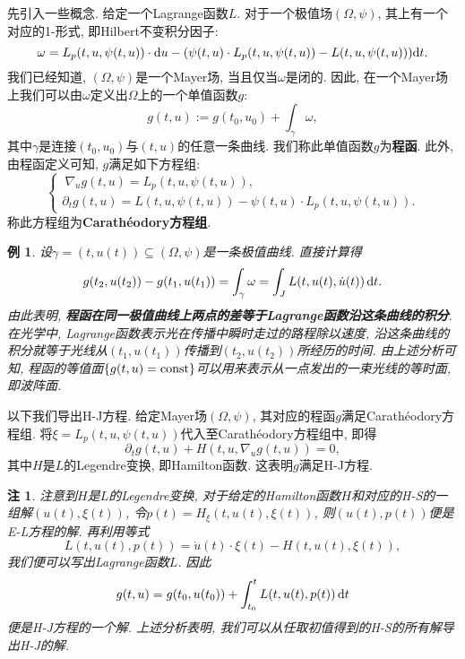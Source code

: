 \documentclass[12pt,a4paper]{article}
\newtheorem{example}[theorem]{例}
\newtheorem{remark}[theorem]{注}
\begin{document}
先引入一些概念. 给定一个Lagrange函数$L$. 对于一个极值场$(\Omega, \psi)$, 其上有一个对应的1-形式, 即Hilbert不变积分因子:
\begin{equation*}
    \omega = L_p(t, u, \psi(t, u)) \cdot {\rm d}u - (\psi(t, u) \cdot L_p(t, u, \psi(t, u)) - L(t, u, \psi(t, u))) {\rm d}t.
\end{equation*}
我们已经知道, $(\Omega, \psi)$是一个Mayer场, 当且仅当$\omega$是闭的. 因此, 在一个Mayer场上我们可以由$\omega$定义出$\Omega$上的一个单值函数$g$:
\begin{equation*}
    \boxed{g(t, u) := g(t_0, u_0) + \int_{\gamma}\omega,}
\end{equation*}
其中$\gamma$是连接$(t_0, u_0)$与$(t, u)$的任意一条曲线. 我们称此单值函数$g$为\textbf{程函}.
此外, 由程函定义可知, $g$满足如下方程组:
\begin{equation*}
    \boxed{\begin{cases} \
        \nabla_ug(t, u) = L_p(t, u, \psi(t, u)), \\  
        \partial_tg(t, u) = L(t, u, \psi(t, u)) - \psi(t, u) \cdot L_p(t, u, \psi(t, u)). 
    \end{cases}}
\end{equation*}
称此方程组为\textbf{Carathéodory方程组}.

\begin{example}
    设$\gamma = (t, u(t)) \subseteq (\Omega, \psi)$是一条极值曲线. 直接计算得 
    \begin{equation*}
        g(t_2, u(t_2)) - g(t_1, u(t_1)) = \int_{\gamma}\omega = \int_JL(t, u(t), \dot u(t)) \,{\rm d}t.
    \end{equation*}
    由此表明, \textbf{程函在同一极值曲线上两点的差等于Lagrange函数沿这条曲线的积分}.
    在光学中, Lagrange函数表示光在传播中瞬时走过的路程除以速度, 沿这条曲线的积分就等于光线从$(t_1, u(t_1))$传播到$(t_2, u(t_2))$所经历的时间.
    由上述分析可知, 程函的等值面$\{g(t, u) = {\rm const}\}$可以用来表示从一点发出的一束光线的等时面, 即波阵面.
\end{example}

以下我们导出H-J方程. 给定Mayer场$(\Omega, \psi)$, 其对应的程函$g$满足Carathéodory方程组.
将$\xi = L_p(t, u, \psi(t, u))$代入至Carathéodory方程组中, 即得  
\begin{equation*}
    \partial_tg(t, u) + H(t, u, \nabla_ug(t, u)) = 0,
\end{equation*}
其中$H$是$L$的Legendre变换, 即Hamilton函数. 这表明$g$满足H-J方程.

\begin{remark}
    注意到$H$是$L$的Legendre变换, 对于给定的Hamilton函数$H$和对应的H-S的一组解$(u(t), \xi(t))$, 令$p(t) = H_{\xi}(t, u(t), \xi(t))$, 则$(u(t), p(t))$便是E-L方程的解. 再利用等式
    \begin{equation*}
        L(t, u(t), p(t)) = \dot u(t) \cdot \xi(t) - H(t, u(t), \xi(t)),
    \end{equation*} 
    我们便可以写出Lagrange函数$L$. 因此 
    \begin{equation*}
        g(t, u) = g(t_0, u(t_0)) + \int_{t_0}^t L(t, u(t), p(t)) \,{\rm d}t
    \end{equation*}
    便是H-J方程的一个解. 上述分析表明, 我们可以从任取初值得到的H-S的所有解导出H-J的解.
\end{remark}
\end{document}
